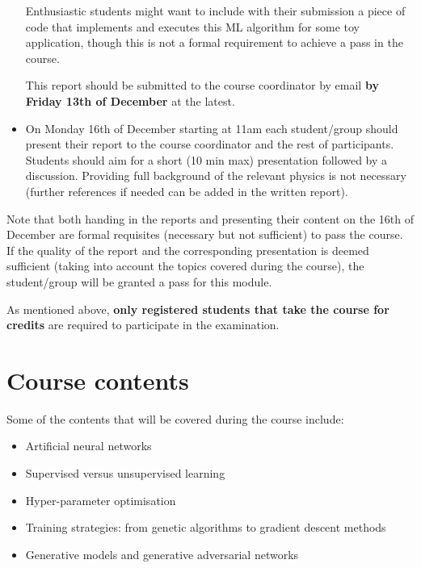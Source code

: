 \documentclass[12pt]{article}
\numberwithin{equation}{section}
\begin{document}
\begin{spacing}{1.1}
\begin{itemize}
  Enthusiastic students might want to include with their submission
a piece of code that implements and executes this ML algorithm for some
toy application, though this is not a formal
requirement to achieve a pass in the course.

This report should be submitted to the course coordinator by email {\bf by Friday 13th of
December} at the latest.

\item On Monday 16th of December starting at 11am
  each student/group should present their report to the course coordinator
  and the rest of participants.
  Students should aim for a short (10 min max) presentation followed
  by a discussion.
  Providing full background of the relevant physics is not necessary
  (further references if needed can be added in the written report).

\end{itemize}  
  
Note that both handing in the reports and presenting their content
on the 16th of December
are formal requisites (necessary but not sufficient) to pass the course.
%
If the quality of the report and the corresponding presentation is deemed
sufficient (taking into account the topics covered during the course),
the student/group will be granted a pass for this module.

As mentioned above, {\bf only registered students that take
  the course for credits} are required to participate
in the examination.


\section{Course contents}

Some of the contents that will be covered during the course include:

\begin{itemize}

\item Artificial neural networks

\item Supervised versus unsupervised learning

\item Hyper-parameter optimisation

\item Training strategies: from genetic algorithms to gradient descent methods

\item Generative models and generative adversarial networks


\end{itemize}
\end{spacing}
\end{document}
